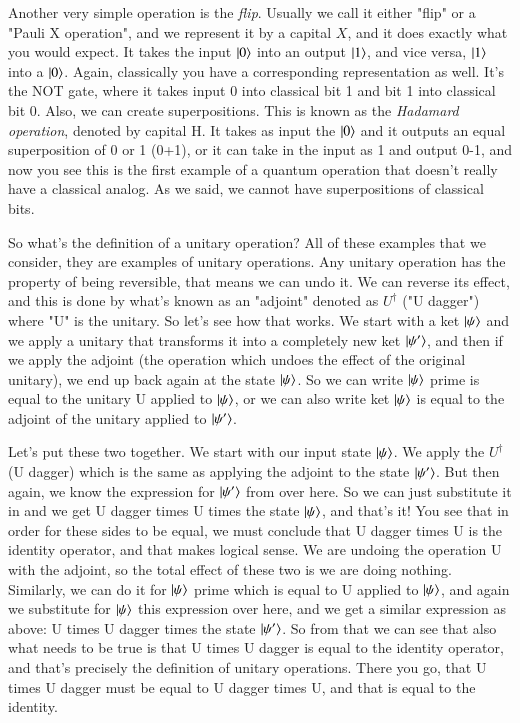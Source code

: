 Another very simple operation is the \emph{flip}. Usually we call it either "flip" or a "Pauli X operation", and we represent it by a capital $X$, and it does exactly what you would expect. It takes the input $\left| 0 \right\rangle$ into an output $\left| 1 \right\rangle$, and vice versa, $\left| 1 \right\rangle$ into a $\left| 0 \right\rangle$. Again, classically you have a corresponding representation as well. It's the NOT gate, where it takes input 0 into classical bit 1 and bit 1 into classical bit 0. Also, we can create superpositions. This is known as the \emph{Hadamard operation}, denoted by capital H. It takes as input the $\left| 0 \right\rangle$ and it outputs an equal superposition of 0 or 1 (0+1), or it can take in the input as 1 and output 0-1, and now you see this is the first example of a quantum operation that doesn't really have a classical analog. As we said, we cannot have superpositions of classical bits.

So what's the definition of a unitary operation? All of these examples that we consider, they are examples of unitary operations. Any unitary operation has the property of being reversible, that means we can undo it. We can reverse its effect, and this is done by what's known as an "adjoint" denoted as $U^\dagger$ ("U dagger") where "U" is the unitary.
So let's see how that works. We start with a ket $\left| \psi \right\rangle$ and we apply a unitary that transforms it into a completely new ket $\left| \psi' \right\rangle$, and then if we apply the adjoint (the operation which undoes the effect of the original unitary), we end up back again at the state $\left| \psi \right\rangle$. So we can write $\left| \psi \right\rangle$ prime is equal to the unitary U applied to $\left| \psi \right\rangle$, or we can also write ket $\left| \psi \right\rangle$ is equal to the adjoint of the unitary applied to $\left| \psi' \right\rangle$. 

Let's put these two together. We start with our input state $\left| \psi \right\rangle$. We apply the $U^\dagger$ (U dagger) which is the same as applying the adjoint to the state $\left| \psi' \right\rangle$. But then again, we know the expression for $\left| \psi' \right\rangle$ from over here. So we can just substitute it in and we get U dagger times U times the state $\left| \psi \right\rangle$, and that's it! You see that in order for these sides to be equal, we must conclude that U dagger times U is the identity operator, and that makes logical sense. We are undoing the operation U with the adjoint, so the total effect of these two is we are doing nothing. Similarly, we can do it for $\left| \psi \right\rangle$ prime which is equal to U applied to $\left| \psi \right\rangle$, and again we substitute for $\left| \psi \right\rangle$ this expression over here, and we get a similar expression as above: U times U dagger times the state $\left| \psi' \right\rangle$. So from that we can see that also what needs to be true is that U times U dagger is equal to the identity operator, and that's precisely the definition of unitary operations. There you go, that U times U dagger must be equal to U dagger times U, and that is equal to the identity. 

